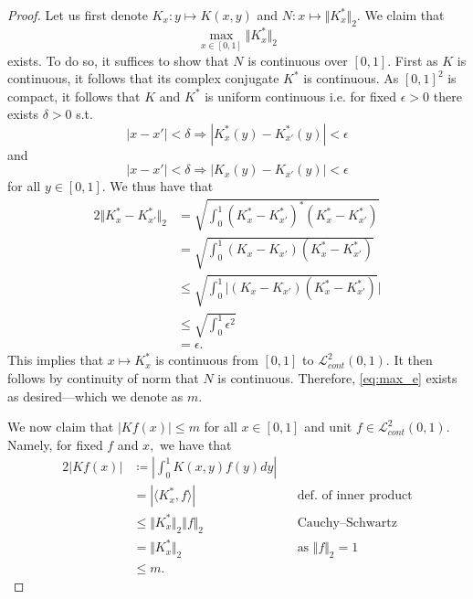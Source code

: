 \documentclass[10pt]{article}
\begin{document}
\begin{proof}
    Let us first denote $K_x : y\mapsto K(x,y)$ and $N: x \mapsto \Vert K_x^*\Vert_2.$ We claim that
    \begin{equation} \label{eq:max_e}
        \max_{x\in[0,1]}\Vert K_x^*\Vert_2
    \end{equation}
    exists. To do so, it suffices to show that $N$ is continuous over $[0,1].$ First as $K$ is continuous, it follows that its complex conjugate $K^*$ is continuous. 
    As $[0,1]^2$ is compact, it follows that $K$ and $K^*$ is uniform continuous i.e. for fixed $\epsilon >0$ there exists $\delta > 0$ s.t.
    \[|x-x'|<\delta\Rightarrow |K_x^* (y)- K^*_{x'}(y)| < \epsilon\]
    and
    \[|x-x'|<\delta\Rightarrow |K_x (y)- K_{x'}(y)| < \epsilon\]
    for all $y\in[0,1].$ We thus have that
    \begin{alignat*}{2}
        \Vert K_x^*- K^*_{x'} \Vert_2 &= \sqrt{\int_{0}^{1}(K_x^*-K^*_{x'})^*(K_x^*-K^*_{x'})}\\
        &= \sqrt{\int_{0}^{1}(K_x-K_{x'})(K_x^*-K^*_{x'})}\\
        &\le \sqrt{\int_{0}^{1}|(K_x-K_{x'})(K_x^*-K^*_{x'})}|\\
        &\le \sqrt{\int_{0}^{1}\epsilon^2}\\
        &= \epsilon.
    \end{alignat*}
    This implies that $x \mapsto K_x^*$ is continuous from $[0,1]$ to $\mathcal{L}^2_{cont}(0,1).$ It then follows by continuity of norm that $N$ is continuous. Therefore, \eqref{eq:max_e} exists as desired---which we denote as $m.$


    We now claim that $|Kf(x)| \le m$ for all $x\in[0,1]$ and unit $f\in\mathcal{L}^2_{cont}(0,1).$ Namely, for fixed $f$ and $x,$ we have that
    \begin{alignat*}{2}
        |Kf(x)| &\coloneqq \left | \int_{0}^{1}K(x,y)f(y)dy \right |\\
        &= | \langle K^*_x, f \rangle | \quad&&\text{def. of inner product}\\
        &\le \Vert K^*_x \Vert_2 \Vert f \Vert_2 &&\text{Cauchy--Schwartz}\\
        &=  \Vert K^*_x \Vert_2&&\text{as $\Vert f\Vert_2 =1$}\\
        &\le m.
    \end{alignat*}


\end{proof}
\end{document}
